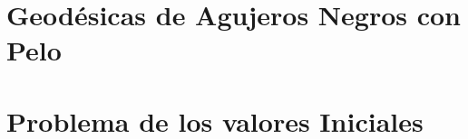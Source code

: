 \documentclass[../Main.tex]{subfiles}
\begin{document}
\section{Geodésicas de Agujeros Negros con Pelo}
\section{Problema de los valores Iniciales}

\biblio %
\end{document}
